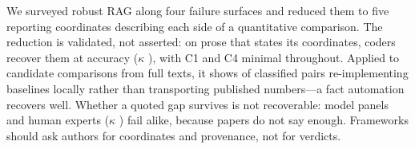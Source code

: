 We surveyed robust RAG along four failure surfaces and reduced them to five reporting
coordinates describing each side of a quantitative comparison. The reduction is validated,
not asserted: on prose that states its coordinates, coders recover them at \InsFullCoord{}
accuracy ($\kappa$ \InsFullK{}), with C1 and C4 minimal throughout. Applied to
\FrameCandidates{} candidate comparisons from \FlowTexts{} full texts, it shows \ProvReimplemented{} of \ProvClassified{} classified pairs
re-implementing baselines locally rather than transporting published numbers---a fact
automation recovers well. Whether a quoted gap survives is not recoverable: model panels and
human experts ($\kappa$ \HumVerdictK{}) fail alike, because papers do not say enough.
Frameworks should ask authors for coordinates and provenance, not for verdicts.
